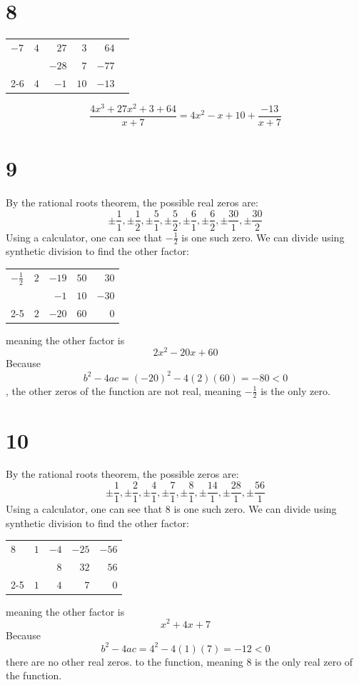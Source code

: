 \documentclass{article}
\theoremstyle{definition}
\begin{document}
\section*{8}
\begin{center}
	\begin{tabular}{l|rrrrr}
		$-7$ & $4$ & $27$ & $3$ & $64$ \\
		& & $-28$ & $7$ & $-77$ \\
		\cmidrule{2-6}
		& $4$ & $-1$ & $10$ & $-13$
	\end{tabular}
\end{center} 
\[ \dfrac{4x^3+27x^2+3+64}{x+7}=4x^2-x+10+\frac{-13}{x+7} \]

\section*{9}
By the rational roots theorem, the possible real zeros are:
\[ \pm\frac{1}{1},\pm\frac{1}{2},\pm\frac{5}{1},\pm\frac{5}{2},\pm\frac{6}{1},\pm\frac{6}{2},\pm\frac{30}{1},\pm\frac{30}{2} \]
Using a calculator, one can see that $-\frac{1}{2}$ is one such zero. We can divide using synthetic division to find the other factor:
\begin{center}
	\begin{tabular}{l|rrrr}
		$-\frac{1}{2}$ & $2$ & $-19$ & $50$ & $30$ \\
		& & $-1$ & $10$ & $-30$ \\
		\cmidrule{2-5}
		& $2$ & $-20$ & $60$ & $0$
	\end{tabular}
\end{center}
meaning the other factor is \[ 2x^2-20x+60 \] Because \[ b^2-4ac=(-20)^2-4(2)(60)=-80<0 \], the other zeros of the function are not real, meaning 
$-\frac{1}{2}$ is the only zero. 

\section*{10}
By the rational roots theorem, the possible zeros are:
\[ \pm\frac{1}{1},\pm\frac{2}{1},\pm\frac{4}{1},\pm\frac{7}{1},\pm\frac{8}{1},\pm\frac{14}{1},\pm\frac{28}{1},\pm\frac{56}{1} \]
Using a calculator, one can see that $8$ is one such zero. We can divide using synthetic division to find the other factor:
\begin{center}
	\begin{tabular}{l|rrrr}
		$8$ & $1$ & $-4$ & $-25$ & $-56$ \\
		& & $8$ & $32$ & $56$ \\
		\cmidrule{2-5}
		& $1$ & $4$ & $7$ & $0$
	\end{tabular}
\end{center}
meaning the other factor is \[ x^2+4x+7 \] Because \[ b^2-4ac=4^2-4(1)(7)=-12<0 \] there are no other real zeros. to the function, meaning 
$8$ is the only real zero of the function. 
\end{document}
